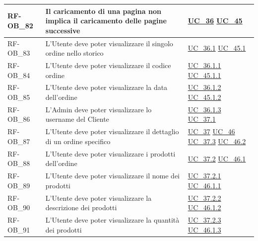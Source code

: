\begin{longtable}{|>{\raggedright}p{}|>{\raggedright\arraybackslash}p{}|>{\raggedright\arraybackslash}p{}|}
	\hline
	RF-OB\_82 \hypertarget{rf-ob_82} & Il caricamento di una pagina non implica il caricamento delle pagine successive & \hyperref[uc_36]{UC\_36} \newline \hyperref[uc_45]{UC\_45} \\
	\hline
	RF-OB\_83 \hypertarget{rf-ob_83} & L'Utente deve poter visualizzare il singolo ordine nello storico & \hyperref[uc_36.1]{UC\_36.1} \newline \hyperref[uc_45.1]{UC\_45.1} \\
	\hline
	RF-OB\_84 \hypertarget{rf-ob_84} & L'Utente deve poter visualizzare il codice ordine & \hyperref[uc_36.1.1]{UC\_36.1.1} \newline \hyperref[uc_45.1.1]{UC\_45.1.1} \\
	\hline
	RF-OB\_85 \hypertarget{rf-ob_85} & L'Utente deve poter visualizzare la data dell'ordine & \hyperref[uc_36.1.2]{UC\_36.1.2} \newline \hyperref[uc_45.1.2]{UC\_45.1.2} \\
	\hline
	RF-OB\_86 \hypertarget{rf-ob_86} & L'Admin deve poter visualizzare lo username del Cliente & \hyperref[uc_36.1.3]{UC\_36.1.3} \newline \hyperref[uc_37.1]{UC\_37.1}\\
	\hline
	RF-OB\_87 \hypertarget{rf-ob_87} & L'Utente deve poter visualizzare il dettaglio di un ordine specifico & \hyperref[uc_37]{UC\_37} \newline \hyperref[uc_46]{UC\_46} \newline \hyperref[uc_37.3]{UC\_37.3} \newline \hyperref[uc_46.2]{UC\_46.2}\\
	\hline
	RF-OB\_88 \hypertarget{rf-ob_88} & L'Utente deve poter visualizzare i prodotti dell'ordine & \hyperref[uc_37.2]{UC\_37.2} \newline \hyperref[uc_46.1]{UC\_46.1} \\
	\hline
	RF-OB\_89 \hypertarget{rf-ob_89} & L'Utente deve poter visualizzare il nome dei prodotti & \hyperref[uc_37.2.1]{UC\_37.2.1} \newline \hyperref[uc_46.1.1]{UC\_46.1.1} \\
	\hline
	RF-OB\_90 \hypertarget{rf-ob_90} & L'Utente deve poter visualizzare la descrizione dei prodotti & \hyperref[uc_37.2.2]{UC\_37.2.2} \newline \hyperref[uc_46.1.2]{UC\_46.1.2} \\
	\hline
	RF-OB\_91 \hypertarget{rf-ob_91} & L'Utente deve poter visualizzare la quantità dei prodotti & \hyperref[uc_37.2.3]{UC\_37.2.3} \newline \hyperref[uc_46.1.3]{UC\_46.1.3} \\

\end{longtable}
